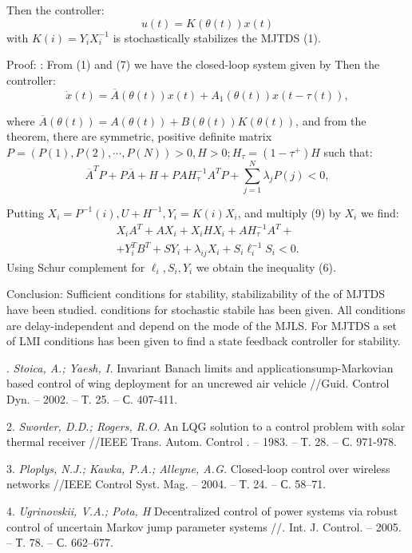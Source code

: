 Then the controller:
\begin{equation}
u(t)=K(\theta(t))x(t)
\end{equation}
with $K(i)=Y_i X_i^{-1}$ is stochastically stabilizes the MJTDS (1).

Proof: : From (1) and (7) we have the closed-loop system given by
Then the controller:
\begin{equation}
\dot{x}(t)=\overline A(\theta(t))x(t) +A_1(\theta(t))x(t-\tau(t)),
\end{equation}

where $\overline A(\theta(t))=A(\theta(t))+B(\theta(t))K(\theta(t))$,  and from the theorem, there are symmetric, positive definite matrix $P=(P(1),P(2),\cdots,P(N))>0 ,H>0; H_\tau =(1-\tau^+)H$ such that:
\begin{equation}
\overline A^TP +P\overline A+H+ PAH_\tau^{-1}A^TP+\sum_{j=1}^{N}\lambda_j P(j)<0,
\end{equation}

Putting  $X_i=P^{-1}(i), U+H^{-1}, Y_i=K(i)X_i$, and multiply (9) by $X_i$  we find:
\begin{multline}
X_iA^T+AX_i+X_iHX_i+AH_\tau ^{-1} A^T+
\\+
Y_i^TB^T+SY_i+\lambda_{ij}X_i+S_i\ell_i^{-1}S_i<0
.
\end{multline}
Using Schur complement for $\ell_i , S_i , Y_i$ we obtain the inequality (6).

Conclusion:
 Sufficient conditions for stability, stabilizability of the of MJTDS have been studied.  conditions for stochastic stabile has been given. All conditions are delay-independent and depend on the mode of the MJLS.  For  MJTDS a set of LMI conditions has been given to find a state feedback controller for stability.

. {\it Stoica, A.; Yaesh, I. }
 Invariant Banach limits and applicationsump-Markovian based control of wing deployment for an uncrewed air vehicle //Guid. Control Dyn. – 2002. – Т. 25.  – С. 407-411.

2. {\it Sworder, D.D.; Rogers, R.O.  }
 An LQG solution to a control problem with solar thermal receiver //IEEE Trans. Autom. Control . – 1983. – Т. 28. – С. 971-978.

3. {\it Ploplys, N.J.; Kawka, P.A.; Alleyne, A.G. }
 Closed-loop control over wireless networks //IEEE Control Syst. Mag. – 2004. – Т. 24.  – С. 58–71.

4. {\it Ugrinovskii, V.A.; Pota, H }
 Decentralized control of power systems via robust control of uncertain Markov jump parameter systems //. Int. J. Control. – 2005. – Т. 78. – С. 662–677.

